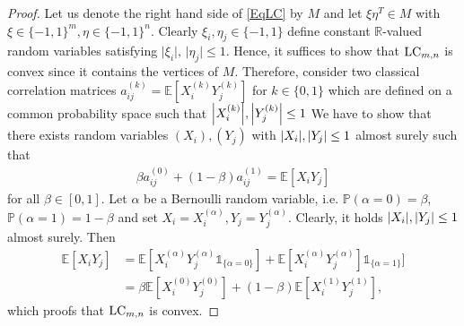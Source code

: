 \begin{proof}
	Let us denote the right hand side of \ref{EqLC} by $ M $ and let $ \xi\eta^T \in M $ with $ \xi \in \{-1,1\}^m, \eta \in \{-1,1\}^n $. Clearly $ \xi_i, \eta_j \in \{-1,1\} $ define constant $ \mathbb{R} $-valued random variables satisfying $ \vert \xi_i \vert, \, \vert \eta_j \vert \le 1 $. Hence, it suffices to show that $ \textup{LC}_{m,n} $ is convex since it contains the vertices of $ M $. Therefore, consider two classical correlation matrices $ a_{ij}^{(k)} = \mathbb{E}[X_i^{(k)}Y_{j}^{(k)}] $ for $ k \in \{0,1\} $ which are defined on a common probability space such that $ {\left|{X_i^{(k)}}\right|},{\left|{Y_j^{(k)}}\right|} \le 1 $ We have to show that there exists random variables $ (X_i),(Y_j) $ with $ {\left|{X_i}\right|},{\left|{Y_j}\right|} \le 1 $ almost surely such that
	\begin{align*}
		\beta a_{ij}^{(0)}+ (1-\beta)a_{ij}^{(1)} = \mathbb{E}[X_iY_j]
	\end{align*}
	for all $ \beta \in [0,1] $.
	Let $ \alpha $ be a Bernoulli random variable, i.e. $ \mathbb{P}(\alpha = 0) = \beta $, $ \mathbb{P}(\alpha = 1) = 1 - \beta$ and set $ X_i = X_i^{(\alpha)}, Y_j = Y_j^{(\alpha)} $.
	Clearly, it holds $ {\left|{X_i}\right|}, {\left|{Y_j}\right|} \le 1 $ almost surely. 
	Then 
	\begin{align*}
		\mathbb{E}[X_iY_j] &= \mathbb{E}[X_i^{(\alpha)}Y_j^{(\alpha)}  \mathds{1}_{ \{\alpha = 0\}}] + \mathbb{E}[X_i^{(\alpha)}Y_j^{(\alpha)}]\mathds{1}_{\{\alpha = 1\}}] \\
		&= \beta \mathbb{E}[X_i^{(0)}Y_j^{(0)} ] + (1-\beta) \mathbb{E}[X_i^{(1)}Y_j^{(1)}],
	\end{align*} 
	which proofs that $ \textup{LC}_{m,n} $ is convex.
	
	
	

\end{proof}
